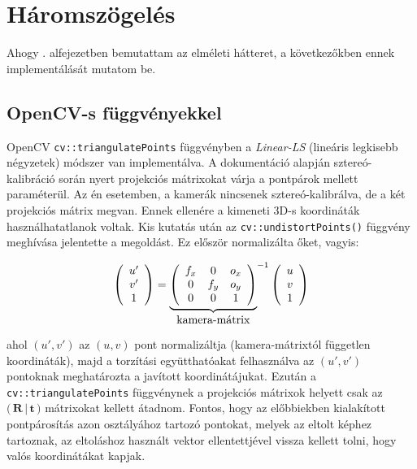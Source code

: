 \section{Háromszögelés}

Ahogy . alfejezetben bemutattam az elméleti hátteret, a következőkben ennek implementálását mutatom be.

\subsection{OpenCV-s függvényekkel}

OpenCV \texttt{cv::triangulatePoints} függvényben a \textit{Linear-LS} (lineáris legkisebb négyzetek) módszer van implementálva. A dokumentáció \cite{camera-calib-3d} alapján sztereó-kalibráció során nyert projekciós mátrixokat várja a pontpárok mellett paraméterül. Az én esetemben, a kamerák nincsenek sztereó-kalibrálva, de a két projekciós mátrix megvan. Ennek ellenére a kimeneti 3D-s koordináták használhatatlanok voltak. Kis kutatás után az \texttt{cv::undistortPoints()} függvény meghívása jelentette a megoldást. Ez először normalizálta őket, vagyis:

\[\left(\begin{array}{c} u' \\ v' \\ 1 \end{array}\right) = {\underbrace{\left(\begin{array}{ccc}
f_x & 0 & o_x \\ 
0 & f_y & o_y \\
0 & 0 & 1
\end{array}\right)}_{\hbox{kamera-mátrix}}}^{-1} \left(\begin{array}{c} u \\ v \\ 1 \end{array}\right)\]

ahol $(u', v')$ az $(u, v)$ pont normalizáltja (kamera-mátrixtól független koordináták), majd a torzítási együtthatóakat felhasználva az $(u', v')$ pontoknak meghatározta a javított koordinátájukat. Ezután a \texttt{cv::triangulatePoints} függvénynek a projekciós mátrixok helyett csak az $\Big(\,\mathbf{R}\,|\,\mathbf{t}\,\Big)$ mátrixokat kellett átadnom. Fontos, hogy az előbbiekben kialakított pontpárosítás azon osztályához tartozó pontokat, melyek az eltolt képhez tartoznak, az eltoláshoz használt vektor ellentettjével vissza kellett tolni, hogy valós koordinátákat kapjak.

